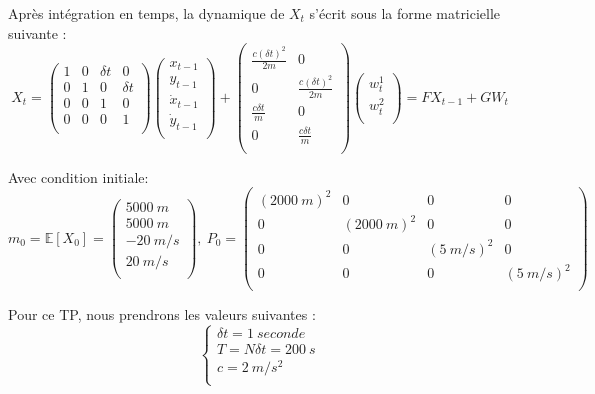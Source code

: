 \documentclass{article}
\begin{document}
Après intégration en temps, la dynamique de $X_t$ s'écrit sous la forme matricielle suivante :
\[ X_t = \left ( 
   \begin{array}{cccc} %
      1 & 0 & \delta t & 0 \\
      0 & 1 & 0 & \delta t \\
      0 & 0 & 1 & 0 \\
      0 & 0 & 0 & 1 \\
   \end{array} \right )
   \left ( 
   \begin{array}{cccc} %
      x_{t-1} \\
      y_{t-1} \\
      \Dot{x}_{t-1} \\
      \Dot{y}_{t-1} \\
   \end{array} \right )
   + \left (
   \begin{array}{cc}
      \frac{c(\delta t)^2}{2m} & 0 \\
      0 & \frac{c(\delta t)^2}{2m} \\
      \frac{c\delta t}{m} & 0 \\
      0 & \frac{c\delta t}{m} \\
   \end{array} \right )
   \left (
   \begin{array}{c}
      w_t^1 \\
      w_t^2 \\
   \end{array} \right )
   = F X_{t-1} + G W_t
\]

Avec condition initiale: 
\[ m_0 = \mathbb{E}[X_0] = \left (
   \begin{array}{c}
      5000\ m \\
      5000\ m \\
      -20\ m/s \\
      20\ m/s \\
   \end{array} \right )
   ,\ P_0 = \left (
   \begin{array}{cccc}
      (2000\ m)^2 & 0 & 0 & 0 \\
      0 & (2000\ m)^2 & 0 & 0 \\
      0 & 0 & (5\ m/s)^2 & 0 \\
      0 & 0 & 0 & (5\ m/s)^2 \\
   \end{array} \right )
\]

Pour ce TP, nous prendrons les valeurs suivantes :
$$ \left\{
   \begin{array}{l}
      \delta t = 1\ seconde\\
      T = N \delta t = 200\ s \\
      c = 2\ m/s^2 \\
   \end{array} \right .$$
\end{document}
